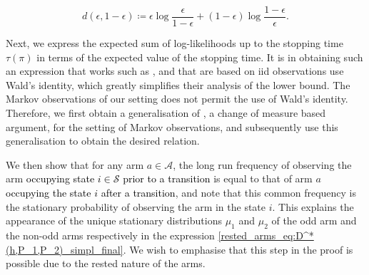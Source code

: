 \begin{equation}
	d(\epsilon,1-\epsilon)\coloneqq\epsilon\log\frac{\epsilon}{1-\epsilon}+(1-\epsilon)\log\frac{1-\epsilon}{\epsilon}.\label{rested_arms_eq:d(epsilon,1-epsilon)}
\end{equation}

Next, we express the expected sum of log-likelihoods up to the stopping time $\tau(\pi)$ in terms of the expected value of the stopping time. It is in obtaining such an expression that works such as \cite{kaufmann2016complexity}, \cite{vaidhiyan2017learning} and \cite{prabhu2017learning} that are based on iid observations use Wald's identity, which greatly simplifies their analysis of the lower bound. The Markov observations of our setting does not permit the use of Wald's identity. Therefore, we first obtain a generalisation of \cite[Lemma 18]{kaufmann2016complexity}, a change of measure based argument, for the setting of Markov observations, and subsequently use this generalisation to obtain the desired relation.

We then show that for any arm $a\in\mathcal{A}$, the long run frequency of observing the arm \textcolor{black}{occupying state $i\in \mathcal{S}$ prior to a transition} is equal to that of arm $a$ \textcolor{black}{occupying the state $i$ after a transition}, and note that this common frequency is the stationary probability of observing the arm in the state $i$. This explains the appearance of the unique stationary distributions $\mu_1$ and $\mu_2$ of the odd arm and the non-odd arms respectively in the expression \eqref{rested_arms_eq:D^*(h,P_1,P_2)_simpl_final}. We wish to emphasise that this step in the proof is possible due to the rested nature of the arms.

